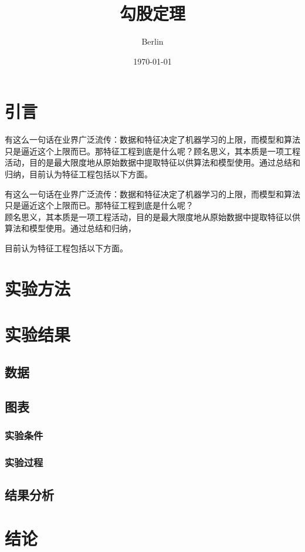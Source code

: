 \documentclass{ctexart}  %
\title{\heiti 勾股定理}  %
\author{\kaishu Berlin} %
\date{\today}  %
\begin{document}
	\maketitle  %
	\section{引言}
	有这么一句话在业界广泛流传：数据和特征决定了机器学习的上限，而模型和算法只是逼近这个上限而已。那特征工程到底是什么呢？顾名思义，其本质是一项工程活动，目的是最大限度地从原始数据中提取特征以供算法和模型使用。通过总结和归纳，目前认为特征工程包括以下方面。
	
	有这么一句话在业界广泛流传：数据和特征决定了机器学习的上限，而模型和算法只是逼近这个上限而已。那特征工程到底是什么呢？\\顾名思义，其本质是一项工程活动，目的是最大限度地从原始数据中提取特征以供算法和模型使用。通过总结和归纳，\par 目前认为特征工程包括以下方面。
	\section{实验方法}
	
	\section{实验结果}
	
	\subsection{数据}
	\subsection{图表}
	\subsubsection{实验条件}
	\subsubsection{实验过程}
	\subsection{结果分析}
	\section{结论}
\end{document}
